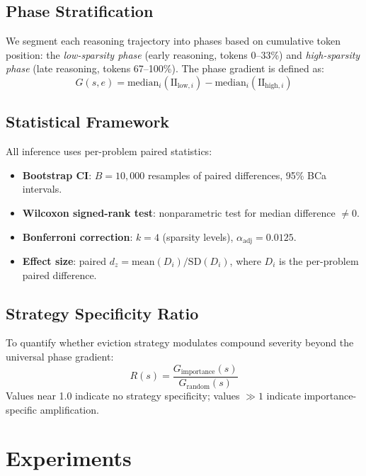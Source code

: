 \documentclass[11pt,a4paper]{article}
\begin{document}
\subsection{Phase Stratification}

We segment each reasoning trajectory into phases based on cumulative token position: the \emph{low-sparsity phase} (early reasoning, tokens 0--33\%) and \emph{high-sparsity phase} (late reasoning, tokens 67--100\%). The phase gradient is defined as:
\begin{equation}
G(s, e) = \text{median}_i(\text{II}_{\text{low},i}) - \text{median}_i(\text{II}_{\text{high},i})
\end{equation}

\subsection{Statistical Framework}

All inference uses per-problem paired statistics:
\begin{itemize}
\item \textbf{Bootstrap CI}: $B = 10{,}000$ resamples of paired differences, 95\% BCa intervals.
\item \textbf{Wilcoxon signed-rank test}: nonparametric test for median difference $\neq 0$.
\item \textbf{Bonferroni correction}: $k = 4$ (sparsity levels), $\alpha_{\text{adj}} = 0.0125$.
\item \textbf{Effect size}: paired $d_z = \text{mean}(D_i) / \text{SD}(D_i)$, where $D_i$ is the per-problem paired difference.
\end{itemize}

\subsection{Strategy Specificity Ratio}

To quantify whether eviction strategy modulates compound severity beyond the universal phase gradient:
\begin{equation}
R(s) = \frac{G_{\text{importance}}(s)}{G_{\text{random}}(s)}
\end{equation}
Values near 1.0 indicate no strategy specificity; values $\gg 1$ indicate importance-specific amplification.

\section{Experiments}
\end{document}
